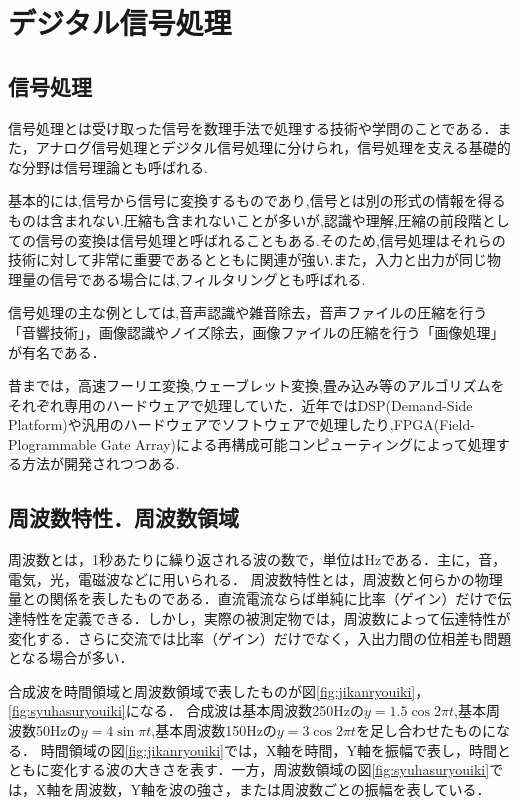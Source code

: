 \documentclass[a4j,11pt]{jsarticle}
\begin{document}
\section{デジタル信号処理}
\subsection{信号処理}
信号処理とは受け取った信号を数理手法で処理する技術や学問のことである．また，アナログ信号処理とデジタル信号処理に分けられ，信号処理を支える基礎的な分野は信号理論とも呼ばれる.

基本的には,信号から信号に変換するものであり,信号とは別の形式の情報を得るものは含まれない.圧縮も含まれないことが多いが,認識や理解,圧縮の前段階としての信号の変換は信号処理と呼ばれることもある.そのため,信号処理はそれらの技術に対して非常に重要であるとともに関連が強い.また，入力と出力が同じ物理量の信号である場合には,フィルタリングとも呼ばれる.

信号処理の主な例としては,音声認識や雑音除去，音声ファイルの圧縮を行う「音響技術」，画像認識やノイズ除去，画像ファイルの圧縮を行う「画像処理」が有名である．

昔までは，高速フーリエ変換,ウェーブレット変換,畳み込み等のアルゴリズムをそれぞれ専用のハードウェアで処理していた．近年ではDSP(Demand-Side Platform)や汎用のハードウェアでソフトウェアで処理したり,FPGA(Field-Plogrammable Gate Array)による再構成可能コンピューティングによって処理する方法が開発されつつある.

\newpage
%

\subsection{周波数特性．周波数領域}
周波数とは，1秒あたりに繰り返される波の数で，単位はHzである．主に，音，電気，光，電磁波などに用いられる．
周波数特性とは，周波数と何らかの物理量との関係を表したものである．直流電流ならば単純に比率（ゲイン）だけで伝達特性を定義できる．しかし，実際の被測定物では，周波数によって伝達特性が変化する．さらに交流では比率（ゲイン）だけでなく，入出力間の位相差も問題となる場合が多い．

合成波を時間領域と周波数領域で表したものが図\ref{fig:jikanryouiki}，\ref{fig:syuhasuryouiki}になる．
合成波は基本周波数250Hzの$y=1.5\cos2\pi t$,基本周波数50Hzの$y = 4\sin\pi t$,基本周波数150Hzの$y = 3\cos2\pi t$を足し合わせたものになる．
時間領域の図\ref{fig:jikanryouiki}では，X軸を時間，Y軸を振幅で表し，時間とともに変化する波の大きさを表す．一方，周波数領域の図\ref{fig:syuhasuryouiki}では，X軸を周波数，Y軸を波の強さ，または周波数ごとの振幅を表している．
\end{document}
